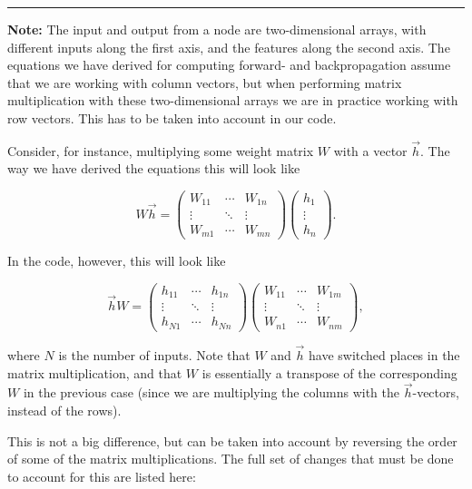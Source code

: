 \documentclass[11pt]{article}
\begin{document}
    \begin{center}\rule{0.5\linewidth}{0.5pt}\end{center}

\textbf{Note:} The input and output from a node are two-dimensional
arrays, with different inputs along the first axis, and the features
along the second axis. The equations we have derived for computing
forward- and backpropagation assume that we are working with column
vectors, but when performing matrix multiplication with these
two-dimensional arrays we are in practice working with row vectors. This
has to be taken into account in our code.

Consider, for instance, multiplying some weight matrix \(W\) with a
vector \(\vec{h}\). The way we have derived the equations this will look
like

\[
W\vec{h} = \begin{pmatrix}
W_{11} & \cdots & W_{1n}\\
\vdots & \ddots & \vdots\\
W_{m1} & \cdots & W_{mn}
\end{pmatrix} \begin{pmatrix}
h_1 \\ \vdots \\ h_n
\end{pmatrix}.
\]

In the code, however, this will look like

\[
\vec{h} W = \begin{pmatrix}
h_{11} & \cdots & h_{1n}\\
\vdots & \ddots & \vdots\\
h_{N1} & \cdots & h_{Nn}
\end{pmatrix} \begin{pmatrix}
W_{11} & \cdots & W_{1m}\\
\vdots & \ddots & \vdots\\
W_{n1} & \cdots & W_{nm}
\end{pmatrix},
\]

where \(N\) is the number of inputs. Note that \(W\) and \(\vec{h}\)
have switched places in the matrix multiplication, and that \(W\) is
essentially a transpose of the corresponding \(W\) in the previous case
(since we are multiplying the columns with the \(\vec{h}\)-vectors,
instead of the rows).

This is not a big difference, but can be taken into account by reversing
the order of some of the matrix multiplications. The full set of changes
that must be done to account for this are listed here:
\end{document}
